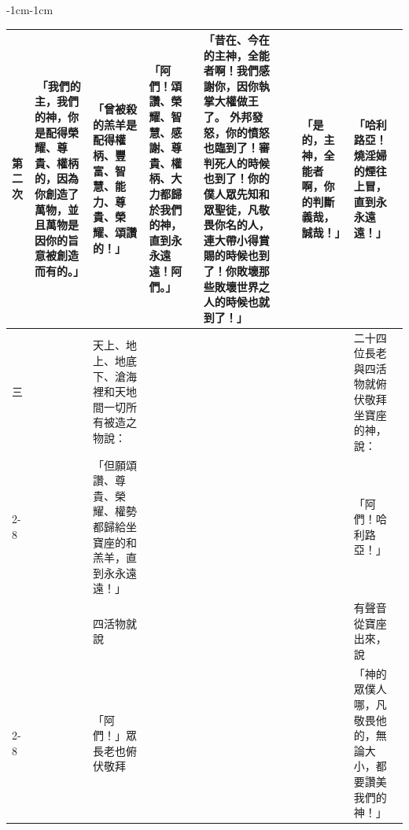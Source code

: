 \begin{changemargin}{-1cm}{-1cm}
\begin{table}
\begin{tabular}{ |p{.3cm}|p{2.5cm}|p{3.5cm}| p{2.5cm}|p{5cm}|p{3.5cm}|p{2cm}|p{4cm}|  }
 \multicolumn{1}{|m{.3cm}|}{第二次}&
\multicolumn{1}{m{2.5cm}|}{ 「我們的主，我們的神，你是配得榮耀、尊貴、權柄的，因為你創造了萬物，並且萬物是因你的旨意被創造而有的。」}  &
\multicolumn{1}{m{3.5cm}|}{「曾被殺的羔羊是配得權柄、豐富、智慧、能力、尊貴、榮耀、頌讚的！」 }  &
 \multicolumn{1}{m{2.5cm}|}{「阿們！頌讚、榮耀、智慧、感謝、尊貴、權柄、大力都歸於我們的神，直到永永遠遠！阿們。」} &
 \multicolumn{1}{m{5cm}|}{「昔在、今在的主神，全能者啊！我們感謝你，因你執掌大權做王了。 外邦發怒，你的憤怒也臨到了！審判死人的時候也到了！你的僕人眾先知和眾聖徒，凡敬畏你名的人，連大帶小得賞賜的時候也到了！你敗壞那些敗壞世界之人的時候也就到了！」}  &
 \multicolumn{1}{m{3.5cm}|}{}   &
 \multicolumn{1}{m{2.5cm}|}{「是的，主神，全能者啊，你的判斷義哉，誠哉！」}  &  
 \multicolumn{1}{m{4cm}|}{「哈利路亞！燒淫婦的煙往上冒，直到永永遠遠！」} \\\hline
 
 
\multicolumn{1}{|m{.3cm}|}{三}&
\multicolumn{1}{m{2.5cm}|}{}  &
\multicolumn{1}{m{3.5cm}|}{天上、地上、地底下、滄海裡和天地間一切所有被造之物說：}  &
 \multicolumn{1}{m{2.5cm}|}{} &
 \multicolumn{1}{m{5cm}|}{}  &
 \multicolumn{1}{m{3.5cm}|}{}   &
 \multicolumn{1}{m{2.5cm}|}{}  &  
 \multicolumn{1}{m{4cm}|}{二十四位長老與四活物就俯伏敬拜坐寶座的神，說：} \\\cline{2-8}
\multicolumn{1}{|m{.3cm}|}{}&
\multicolumn{1}{m{2.5cm}|}{}  &
\multicolumn{1}{m{3.5cm}|}{「但願頌讚、尊貴、榮耀、權勢都歸給坐寶座的和羔羊，直到永永遠遠！」}  &
 \multicolumn{1}{m{2.5cm}|}{} &
 \multicolumn{1}{m{5cm}|}{}  &
 \multicolumn{1}{m{3.5cm}|}{}   &
 \multicolumn{1}{m{2.5cm}|}{}  &  
 \multicolumn{1}{m{4cm}|}{「阿們！哈利路亞！」} \\\hline

 
 \multicolumn{1}{|m{.3cm}|}{}&
\multicolumn{1}{m{2.5cm}|}{}  &
\multicolumn{1}{m{3.5cm}|}{四活物就說}  &
 \multicolumn{1}{m{2.5cm}|}{} &
 \multicolumn{1}{m{5cm}|}{}  &
 \multicolumn{1}{m{3.5cm}|}{}   &
 \multicolumn{1}{m{2.5cm}|}{}  &  
 \multicolumn{1}{m{4cm}|}{有聲音從寶座出來，說} \\\cline{2-8}
  \multicolumn{1}{|m{.3cm}|}{四}&
\multicolumn{1}{m{2.5cm}|}{}  &
\multicolumn{1}{m{3.5cm}|}{「阿們！」眾長老也俯伏敬拜}  &
 \multicolumn{1}{m{2.5cm}|}{} &
 \multicolumn{1}{m{5cm}|}{}  &
 \multicolumn{1}{m{3.5cm}|}{}   &
 \multicolumn{1}{m{2.5cm}|}{}  &  
 \multicolumn{1}{m{4cm}|}{「神的眾僕人哪，凡敬畏他的，無論大小，都要讚美我們的神！」} \\\hline
 
 
 

\end{tabular}
\end{table}
\end{changemargin}
